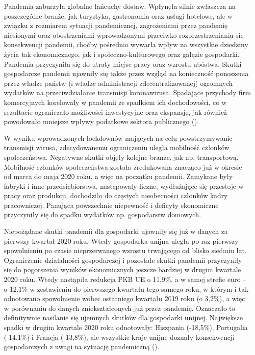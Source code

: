 \documentclass[polish, twoside, 12pt, a4paper]{article}
\theoremstyle{definition}
\theoremstyle{plain}
\theoremstyle{remark}
\begin{document}
Pandemia zaburzyła globalne łańcuchy dostaw. Wpłynęła silnie zwłaszcza na poszczególne branże, jak turystyka, gastronomia oraz usługi hotelowe, ale w związku z rozmiarem sytuacji pandemicznej, zagrożeniami przez pandemię niesionymi oraz obostrzeniami wprowadzonymi przeciwko rozprzestrzenianiu się konsekwencji pandemii, choćby pośrednio wywarła wpływ na wszystkie dziedziny życia tak ekonomicznego, jak i społeczno-kulturowego oraz gałęzie gospodarki. Pandemia przyczyniła się do utraty miejsc pracy oraz wzrostu ubóstwa. Skutki gospodarcze pandemii ujawniły się także przez wzgląd na konieczność ponoszenia przez władze państw (i władze administracji zdecentralizowanej) ogromnych wydatków na przeciwdziałanie transmisji koronawirusa. Spadające przychody firm komercyjnych korelowały w pandemii ze spadkiem ich dochodowości, co w rezultacie ograniczało możliwości inwestycyjne oraz ekspansję, jak również powodowało mniejsze wpływy podatkowe sektora publicznego (\cite{dziembala2021}).  

W wyniku wprowadzonych lockdownów mających na celu powstrzymywanie transmisji wirusa, zdecydowanemu ograniczeniu uległa mobilność członków społeczeństwa. Negatywne skutki objęły kolejne branże, jak np. transportową. Mobilność członków społeczeństwa została zredukowana znacząco już w okresie od marca do maja 2020 roku, a więc na początku pandemii. Zamykane były fabryki i inne przedsiębiorstwa, następowały liczne, wydłużające się przestoje w pracy oraz produkcji, dochodziło do częstych nieobecności członków kadry pracowniczej. Panująca powszechnie niepewność i deficyty ekonomiczne przyczyniły się do spadku wydatków np. gospodarstw domowych. 

Niepożądane skutki pandemii dla gospodarki ujawniły się już w danych za pierwszy kwartał 2020 roku. Wtedy gospodarka unijna uległa po raz pierwszy spowolnieniu po czasie nieprzerwanego wzrostu trwającego od blisko siedmiu lat. Ograniczenie działalności gospodarczej i pozostałe skutki pandemii przyczyniły się do pogorszenia wyników ekonomicznych jeszcze bardziej w drugim kwartale 2020 roku. Wtedy nastąpiła redukcja PKB UE o 11,9\%, a w samej strefie euro – o 12,1\% w zestawieniu do pierwszego kwartału tego samego roku, w którym i tak odnotowano spowolnienie wobec ostatniego kwartału 2019 roku (o 3,2\%), a więc w porównaniu do danych zniekształconych już przez pandemię. Oznaczało to definitywnie nasilanie się ujemnych skutków dla gospodarki unijnej. Największe spadki w drugim kwartale 2020 roku odnotowały: Hiszpania (-18,5\%), Portugalia (-14,1\%) i Francja (-13,8\%), ale wszystkie kraje unijne doznały konsekwencji gospodarczych z uwagi na sytuację pandemiczną (\cite{dziembala2021}). 
\end{document}
